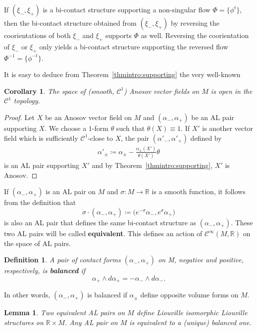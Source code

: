 \documentclass[letterpaper, 11pt]{article}
\numberwithin{equation}{section}
\newtheorem{cor}[thm]{Corollary}
\newtheorem{lem}[thm]{Lemma}
\newtheorem{defn}[thm]{Definition}
\newcommand{\R}{\mathbb{R}}
\begin{document}
If $(\xi_-, \xi_+)$ is a bi-contact structure supporting a non-singular flow $\Phi = \{\phi^t\}$, then the bi-contact structure obtained from $(\xi_-, \xi_+)$ by reversing the coorientations of both $\xi_-$ and $\xi_+$ supports $\Phi$ as well. Reversing the coorientation of $\xi_-$ or $\xi_+$ only yields a bi-contact structure supporting the reversed flow $\Phi^{-1} = \{\phi^{-t}\}$.

It is easy to deduce from Theorem~\ref{thmintro:supporting} the very well-known

\begin{cor} The space of (smooth, $\mathcal{C}^1$) Anosov vector fields on $M$ is open in the $\mathcal{C}^1$ topology.
\end{cor}

\begin{proof}
Let $X$ be an Anosov vector field on $M$ and $(\alpha_-, \alpha_+)$ be an AL pair supporting $X$. We choose a $1$-form $\theta$ such that $\theta(X) \equiv 1 $. If $X'$ is another vector field which is sufficiently $\mathcal{C}^1$-close to $X$, the pair $(\alpha'_-, \alpha'_+)$ defined by
\begin{align*}
\alpha'_\pm \coloneqq \alpha_\pm - \frac{\alpha_\pm(X')}{\theta(X')} \theta
\end{align*}
is an AL pair supporting $X'$ and by Theorem~\ref{thmintro:supporting}, $X'$ is Anosov.
\end{proof}

If $(\alpha_-, \alpha_+)$ is an AL pair on $M$ and $\sigma: M \rightarrow \R$ is a smooth function, it follows from the definition that $$\sigma \cdot (\alpha_-, \alpha_+) \coloneqq \big(e^{-\sigma} \alpha_-, e^{\sigma} \alpha_+\big)$$
is also an AL pair that defines the same bi-contact structure as $(\alpha_-, \alpha_+)$. These two AL pairs will be called \textbf{equivalent}. This defines  an action of $\mathcal{C}^\infty(M, \R)$ on the space of AL pairs.

\begin{defn}
A pair of contact forms $(\alpha_-, \alpha_+)$ on M, negative and positive, respectively, is \textbf{balanced} if $$ \alpha_+ \wedge d\alpha_+ = - \alpha_- \wedge d\alpha_-.$$
\end{defn}

In other words, $(\alpha_-, \alpha_+)$ is balanced if $\alpha_\pm$ define opposite volume forms on $M$.

\begin{lem} \label{lem:balanced}
Two equivalent AL pairs on $M$ define Liouville isomorphic Liouville structures on $\R \times M$. Any AL pair on $M$ is equivalent to a (unique) balanced one.
\end{lem}
\end{document}
